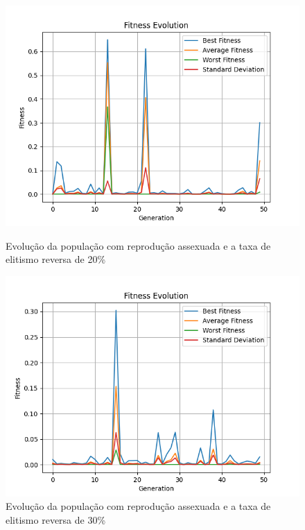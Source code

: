 \documentclass[12pt]{article}
\begin{document}
\begin{figure}[h]
    \centering
    \begin{minipage}{0.5\textwidth}
        \centering
        \includegraphics[width=\linewidth]{figures/assexuado/rev_el_20.png}
        \caption{Evolução da população com reprodução assexuada e a taxa de elitismo reversa de 20\%}
        \label{fig:reverse_elitism_assex_20}
    \end{minipage}\hfill
    \begin{minipage}{0.5\textwidth}
        \centering
        \includegraphics[width=\linewidth]{figures/assexuado/rev_el_30.png}
        \caption{Evolução da população com reprodução assexuada e a taxa de elitismo reversa de 30\%}
        \label{fig:reverse_elitism_assex_30}
    \end{minipage}
\end{figure}
\end{document}
